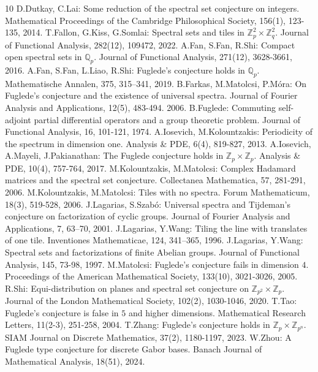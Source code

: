 \documentclass[A4, 11pt]{article}
\begin{document}
{\small
\begin{thebibliography}{10}
 D.Dutkay, C.Lai: Some reduction of the spectral set conjecture on integers. Mathematical Proceedings of the Cambridge Philosophical Society, 156(1), 123-135, 2014.
 T.Fallon, G.Kiss, G.Somlai: Spectral sets and tiles in $\mathbb Z_p^2\times \mathbb Z_q^2$. Journal of Functional Analysis, 282(12), 109472, 2022.
 A.Fan, S.Fan, R.Shi: Compact open spectral sets in $\mathbb Q_p$. Journal of Functional Analysis, 271(12), 3628-3661, 2016.
 A.Fan, S.Fan, L.Liao, R.Shi: Fuglede’s conjecture holds in $\mathbb Q_p$. Mathematische Annalen, 375, 315–341, 2019.
  B.Farkas, M.Matolcsi, P.M{\'o}ra: On Fuglede's conjecture and the existence of universal spectra. Journal of Fourier Analysis and Applications, 12(5), 483-494. 2006.
 B.Fuglede: Commuting self-adjoint partial differential operators and a group theoretic problem. Journal of Functional Analysis, 16, 101-121, 1974.
 A.Iosevich, M.Kolountzakis: Periodicity of the spectrum in dimension one. Analysis \& PDE, 6(4), 819-827, 2013.
 A.Iosevich, A.Mayeli, J.Pakianathan: The Fuglede conjecture holds in $\mathbb Z_p\times\mathbb Z_p$. Analysis \& PDE, 10(4), 757-764, 2017.
 M.Kolountzakis, M.Matolcsi: Complex Hadamard matrices and the spectral set conjecture. Collectanea Mathematica, 57, 281-291, 2006. 
 M.Kolountzakis, M.Matolcsi: Tiles with no spectra. Forum Mathematicum, 18(3), 519-528, 2006.
 J.Lagarias, S.Szab\'o: Universal spectra and Tijdeman’s conjecture on factorization of cyclic groups. Journal of Fourier Analysis and Applications, 7, 63–70, 2001.
 J.Lagarias, Y.Wang: Tiling the line with translates of one tile. Inventiones Mathematicae, 124, 341–365, 1996.  
 J.Lagarias, Y.Wang: Spectral sets and factorizations of finite Abelian groups. Journal of Functional Analysis, 145, 73-98, 1997.
 M.Matolcsi: Fuglede's conjecture fails in dimension $4$. Proceedings of the American Mathematical Society, 133(10), 3021-3026, 2005.
 R.Shi: Equi-distribution on planes and spectral set conjecture on $\mathbb Z_{p^2}\times \mathbb Z_p$. Journal of the London Mathematical Society, 102(2), 1030-1046, 2020.
 T.Tao: Fuglede’s conjecture is false in $5$ and higher dimensions. Mathematical Research Letters, 11(2-3), 251-258, 2004.
 T.Zhang: Fuglede’s conjecture holds in $\mathbb Z_p\times \mathbb Z_{p^n}$. SIAM Journal on Discrete Mathematics, 37(2),  1180-1197, 2023.
 W.Zhou: A Fuglede type conjecture for discrete Gabor bases. Banach Journal of Mathematical Analysis, 18(51), 2024.
\end{thebibliography}} 
\end{document}
